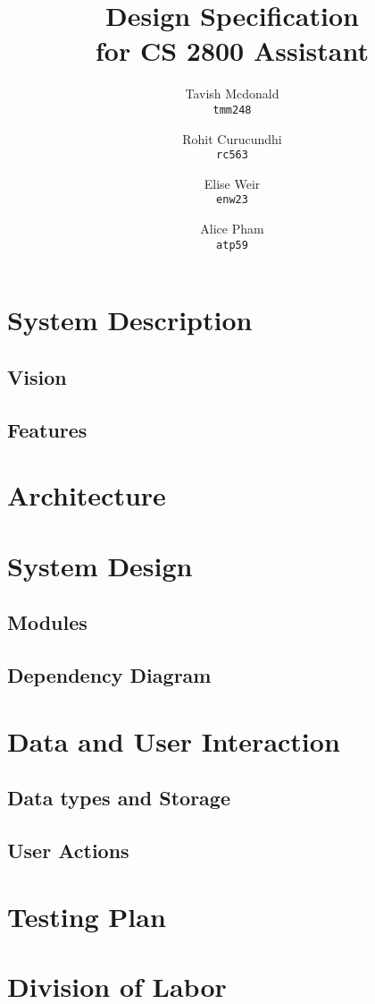 \documentclass[a4paper]{article}
\begin{document}
\title{Design Specification \\
for CS 2800 Assistant} 
\author{
Tavish Mcdonald\\ 
\texttt{tmm248}
\and
Rohit Curucundhi\\
\texttt{rc563}
\and
Elise Weir\\
\texttt{enw23}
\and 
Alice Pham\\
\texttt{atp59}
}
\date{\vspace{-5ex}}
\maketitle
\tableofcontents
\section{System Description}
\subsection{Vision}
\subsection{Features}
\section{Architecture}
\section{System Design}
\subsection{Modules}
\subsection{Dependency Diagram}
\section{Data and User Interaction}
\subsection{Data types and  Storage}
\subsection{User Actions}
\section{Testing Plan}
\section{Division of Labor}
\end{document}
